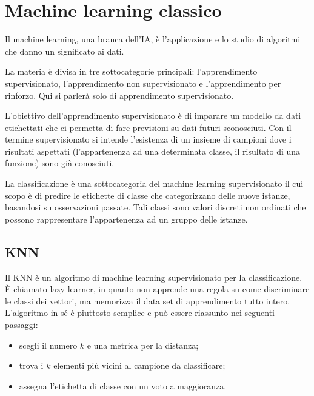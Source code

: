\section{Machine learning classico} \label{sec:machine_learning}


\begin{definition}
    Il machine learning, una branca dell'\ac{IA}, è l'applicazione e lo studio  
    di algoritmi che danno un significato ai dati. 
\end{definition}

La materia è divisa in tre sottocategorie principali: 
l'apprendimento supervisionato, l'apprendimento non supervisionato e l'apprendimento per rinforzo. 
Qui si parlerà solo di apprendimento supervisionato. 

L'obiettivo dell'apprendimento supervisionato è di imparare un modello da dati 
etichettati che ci permetta di fare previsioni su dati futuri sconosciuti. 
Con il termine supervisionato si intende l'esistenza di un insieme di campioni 
dove i risultati aspettati (l'appartenenza ad una determinata classe, il 
risultato di una funzione) sono già conosciuti. 

La classificazione
è una sottocategoria del machine learning supervisionato il cui 
scopo è di predire le etichette di classe che categorizzano delle nuove istanze, 
basandosi su osservazioni passate. Tali classi sono valori discreti non ordinati 
che possono rappresentare l'appartenenza ad un gruppo delle istanze. 

\subsection{KNN} \label{sec:knn}

Il \acf{KNN} è un algoritmo di machine learning supervisionato per la classificazione. 
È chiamato lazy learner, in quanto non apprende una regola su come discriminare 
le classi dei vettori, ma memorizza il data set di apprendimento tutto intero. 
L'algoritmo in sé è piuttosto semplice e può essere riassunto nei seguenti passaggi: 
\begin{itemize}
    \item scegli il numero $k$ e una metrica per la distanza; 
    \item trova i $k$ elementi più vicini al campione da classificare; 
    \item assegna l'etichetta di classe con un voto a maggioranza. 
\end{itemize}

